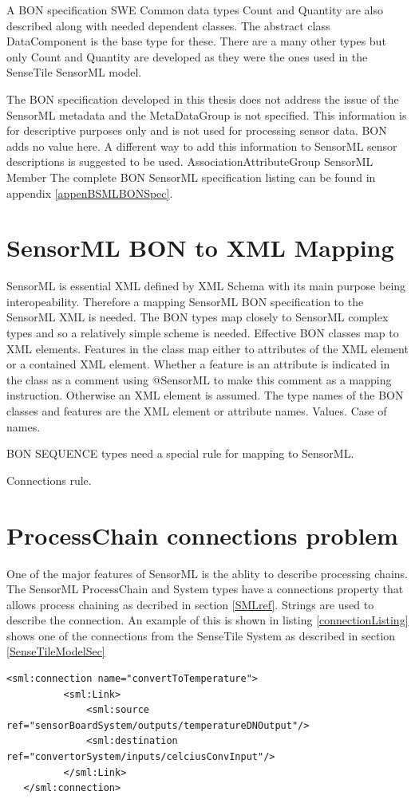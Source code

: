 \documentclass[]{final_report}
\begin{document}
A BON specification SWE Common data types Count and Quantity are also described along with needed dependent classes. The abstract class DataComponent is the base type for these. There are a many other types but only Count and Quantity are developed as they were the ones used in the SenseTile SensorML model.

The BON specification developed in this thesis does not address the issue of the SensorML metadata and the MetaDataGroup is not specified. This information is for descriptive purposes only and is not used for processing sensor data. BON adds no value here. A different way to add this information to SensorML sensor descriptions is suggested to be used.
AssociationAttributeGroup
SensorML
Member
The complete BON SensorML specification listing can be found in appendix \ref{appenBSMLBONSpec}.

\section{SensorML BON to XML Mapping}
SensorML is essential XML defined by XML Schema with its main purpose being interopeability. Therefore a mapping SensorML BON specification to the SensorML XML is needed. The BON types map closely to SensorML complex types and so a relatively simple scheme is needed.
Effective BON classes map to XML elements. Features in the class map either to attributes of the XML element or a contained XML element. Whether a feature is an attribute is indicated in the class as a comment using @SensorML to make this comment as a mapping instruction. Otherwise an XML element is assumed. The type names of the BON classes and features are the XML element or attribute names. Values. Case of names.

BON SEQUENCE types need a special rule for mapping to SensorML.

Connections rule.

\section{ProcessChain connections problem}
One of the major features of SensorML is the ablity to describe processing chains. The SensorML ProcessChain and System types have a connections property that allows process chaining as decribed in section \ref{SMLref}. Strings are used to describe the connection. An example of this is shown in listing \ref{connectionListing} shows one of the connections from the SenseTile System as described in section \ref{SenseTileModelSec}
\begin{lstlisting}[label=connectionListing,caption=SenseTile System connectionconvertToTemperature]
   <sml:connection name="convertToTemperature">
          <sml:Link>
              <sml:source ref="sensorBoardSystem/outputs/temperatureDNOutput"/>
              <sml:destination ref="convertorSystem/inputs/celciusConvInput"/>
          </sml:Link>
   </sml:connection>

\end{lstlisting}
\end{document}
